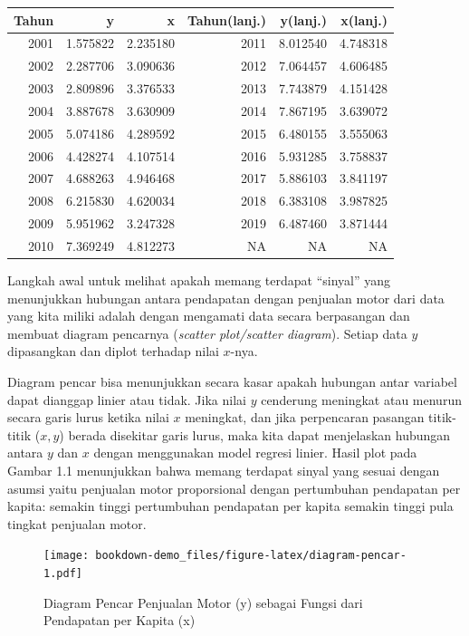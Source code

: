 \documentclass[
]{book}
\begin{document}
\begin{table}
\centering
\begin{tabular}[t]{r|r|r|r|r|r}
\hline
Tahun & y & x & Tahun(lanj.) & y(lanj.) & x(lanj.)\\
\hline
2001 & 1.575822 & 2.235180 & 2011 & 8.012540 & 4.748318\\
\hline
2002 & 2.287706 & 3.090636 & 2012 & 7.064457 & 4.606485\\
\hline
2003 & 2.809896 & 3.376533 & 2013 & 7.743879 & 4.151428\\
\hline
2004 & 3.887678 & 3.630909 & 2014 & 7.867195 & 3.639072\\
\hline
2005 & 5.074186 & 4.289592 & 2015 & 6.480155 & 3.555063\\
\hline
2006 & 4.428274 & 4.107514 & 2016 & 5.931285 & 3.758837\\
\hline
2007 & 4.688263 & 4.946468 & 2017 & 5.886103 & 3.841197\\
\hline
2008 & 6.215830 & 4.620034 & 2018 & 6.383108 & 3.987825\\
\hline
2009 & 5.951962 & 3.247328 & 2019 & 6.487460 & 3.871444\\
\hline
2010 & 7.369249 & 4.812273 & NA & NA & NA\\
\hline
\end{tabular}
\end{table}

Langkah awal untuk melihat apakah memang terdapat ``sinyal'' yang menunjukkan hubungan antara pendapatan dengan penjualan motor dari data yang kita miliki adalah dengan mengamati data secara berpasangan dan membuat diagram pencarnya (\emph{scatter plot/scatter diagram}). Setiap data \(y\) dipasangkan dan diplot terhadap nilai \(x\)-nya.

Diagram pencar bisa menunjukkan secara kasar apakah hubungan antar variabel dapat dianggap linier atau tidak. Jika nilai \(y\) cenderung meningkat atau menurun secara garis lurus ketika nilai \(x\) meningkat, dan jika perpencaran pasangan titik-titik (\(x,y\)) berada disekitar garis lurus, maka kita dapat menjelaskan hubungan antara \(y\) dan \(x\) dengan menggunakan model regresi linier. Hasil plot pada Gambar 1.1 menunjukkan bahwa memang terdapat sinyal yang sesuai dengan asumsi yaitu penjualan motor proporsional dengan pertumbuhan pendapatan per kapita: semakin tinggi pertumbuhan pendapatan per kapita semakin tinggi pula tingkat penjualan motor.

\begin{figure}
\centering
\texttt{[image: bookdown-demo\_files/figure-latex/diagram-pencar-1.pdf]}
\caption{\label{fig:diagram-pencar}Diagram Pencar Penjualan Motor (y) sebagai Fungsi dari Pendapatan per Kapita (x)}
\end{figure}
\end{document}
